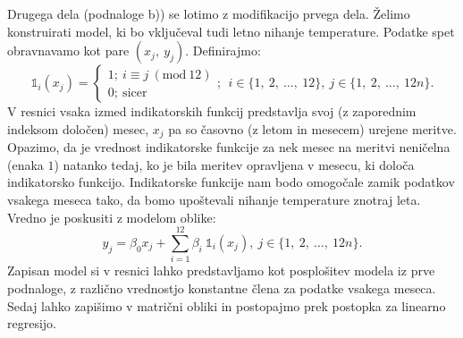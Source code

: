\documentclass{article}
\begin{document}
Drugega dela (podnaloge b)) se lotimo z modifikacijo prvega dela. Želimo konstruirati model, ki bo vključeval tudi letno nihanje temperature. 
Podatke spet obravnavamo kot pare $(x_j,~y_j)$. Definirajmo:
$$
\mathds{1}_i(x_j)= \begin{cases}
    1;~ i \equiv j~(\text{mod}~12) \\
    0;~\text{sicer}
\end{cases};~~i \in \{1,~2,~\dots,~12\},~j \in \{1,~2,~\dots,~12n\}.
$$
V resnici vsaka izmed indikatorskih funkcij predstavlja svoj (z zaporednim indeksom določen) mesec, $x_j$ pa so časovno (z letom in mesecem) urejene meritve. 
Opazimo, da je vrednost indikatorske funkcije za nek mesec na meritvi neničelna (enaka $1$) natanko tedaj, ko je bila meritev opravljena v mesecu, ki določa indikatorsko funkcijo.
Indikatorske funkcije nam bodo omogočale zamik podatkov vsakega meseca tako, da bomo upoštevali nihanje temperature znotraj leta. 
Vredno je poskusiti z modelom oblike:
$$
    y_j = \beta_0 x_j + \sum_{i=1}^{12}{\beta_{i}~\mathds{1}_i(x_j)},~j \in \{1,~2,~\dots,~12n\}.
$$
Zapisan model si v resnici lahko predstavljamo kot posplošitev modela iz prve podnaloge, z različno vrednostjo konstantne člena za podatke vsakega meseca. 
\newline
\newline
Sedaj lahko zapišimo v  matrični obliki in postopajmo prek postopka za linearno regresijo. 
\end{document}
